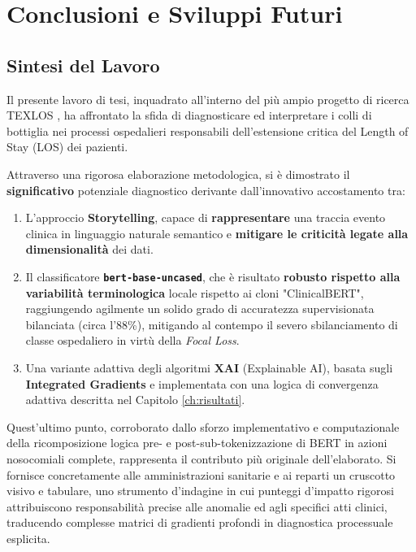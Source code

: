 
\chapter{Conclusioni e Sviluppi Futuri}
\label{ch:conclusioni}

\section{Sintesi del Lavoro}
Il presente lavoro di tesi, inquadrato all'interno del più ampio progetto di ricerca TEXLOS \cite{texlos2026}, ha affrontato la sfida di diagnosticare ed interpretare i colli di bottiglia nei processi ospedalieri responsabili dell'estensione critica del Length of Stay (LOS) dei pazienti.

Attraverso una rigorosa elaborazione metodologica, si è dimostrato il \textbf{significativo} potenziale diagnostico derivante dall'innovativo accostamento tra: 
\begin{enumerate}
    \item L'approccio \textbf{Storytelling}, capace di \textbf{rappresentare} una traccia evento clinica in linguaggio naturale semantico e \textbf{mitigare le criticità legate alla dimensionalità} dei dati.
    \item Il classificatore \textbf{\texttt{bert-base-uncased}}, che è risultato \textbf{robusto rispetto alla variabilità terminologica} locale rispetto ai cloni "ClinicalBERT", raggiungendo agilmente un solido grado di accuratezza supervisionata bilanciata (circa l'88\%), mitigando al contempo il severo sbilanciamento di classe ospedaliero in virtù della \textit{Focal Loss}.
    \item Una variante adattiva degli algoritmi \textbf{XAI} (Explainable AI), basata sugli \textbf{Integrated Gradients} e implementata con una logica di convergenza adattiva descritta nel Capitolo \ref{ch:risultati}.
\end{enumerate}

Quest'ultimo punto, corroborato dallo sforzo implementativo e computazionale della ricomposizione logica pre- e post-sub-tokenizzazione di BERT in azioni nosocomiali complete, rappresenta il contributo più originale dell'elaborato. Si fornisce concretamente alle amministrazioni sanitarie e ai reparti un cruscotto visivo e tabulare, uno strumento d'indagine in cui punteggi d'impatto rigorosi attribuiscono responsabilità precise alle anomalie ed agli specifici atti clinici, traducendo complesse matrici di gradienti profondi in diagnostica processuale esplicita.

